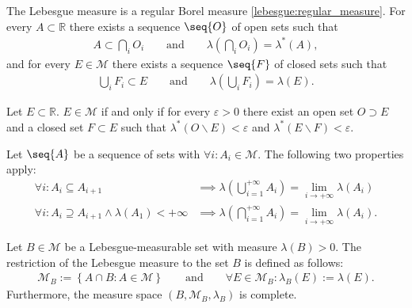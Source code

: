     \begin{property}
        The Lebesgue measure is a regular Borel measure \ref{lebesgue:regular_measure}. For every $A\subset\mathbb{R}$ there exists a sequence $\seq{O}$ of open sets such that
        \begin{gather}
            \label{lebesgue:theorem:open_cover_existence}
            A\subset\bigcap_iO_i\qquad\text{and}\qquad\lambda\left(\bigcap_iO_i\right) = \lambda^*(A),
        \end{gather}
        and for every $E\in\mathcal{M}$ there exists a sequence $\seq{F}$ of closed sets such that
        \begin{gather}
            \label{lebesgue:theorem:closed_cover_existence}
            \bigcup_iF_i\subset E\qquad\text{and}\qquad\lambda\left(\bigcup_iF_i\right) = \lambda(E).
        \end{gather}
    \end{property}

    \begin{property}
        Let $E\subset\mathbb{R}$. $E\in\mathcal{M}$ if and only if for every $\varepsilon>0$ there exist an open set $O\supset E$ and a closed set $F\subset E$ such that $\lambda^*(O\backslash E) < \varepsilon$ and $\lambda^*(E\backslash F)<\varepsilon$.
    \end{property}

    \begin{property}
        Let $\seq{A}$ be a sequence of sets with $\forall i:A_i\in\mathcal{M}$. The following two properties apply:
        \begin{align}
            \forall i: A_i\subseteq A_{i+1} &\implies \lambda\left(\bigcup_{i=1}^{+\infty}A_i\right) = \lim_{i\rightarrow+\infty}\lambda(A_i)\\
            \forall i: A_i\supseteq A_{i+1} \land \lambda(A_1)<+\infty &\implies \lambda\left(\bigcap_{i=1}^{+\infty}A_i\right) = \lim_{i\rightarrow+\infty}\lambda(A_i).
        \end{align}
    \end{property}

    \begin{construct}[Restriction]\label{lebesgue:restricted_lebesgue_measure}
        Let $B\in\mathcal{M}$ be a Lebesgue-measurable set with measure $\lambda(B)>0$. The restriction of the Lebesgue measure to the set $B$ is defined as follows:
        \begin{gather}
            \mathcal{M}_B := \left\{A\cap B:A\in\mathcal{M}\right\}\qquad\text{and}\qquad\forall E\in\mathcal{M}_B:\lambda_B(E) := \lambda(E).
        \end{gather}
        Furthermore, the measure space $(B,\mathcal{M}_B,\lambda_B)$ is complete.
    \end{construct}


